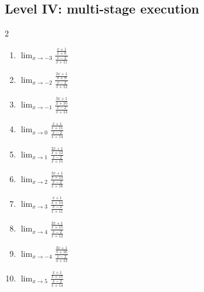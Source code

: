 \documentclass[11pt,oneside]{book}
\begin{document}
\subsection*{Level IV: multi-stage execution}
\begin{multicols}{2}
\begin{enumerate}[leftmargin=*,label=\textbf{\arabic*.},itemsep=0.65\baselineskip]
\item $\displaystyle \lim_{x \to -3} \frac{\frac{x + 1}{x + 8}}{\frac{x - 2}{x + 11}}$
\item $\displaystyle \lim_{x \to -2} \frac{\frac{2 x + 1}{x + 9}}{\frac{x - 2}{x + 12}}$
\item $\displaystyle \lim_{x \to -1} \frac{\frac{3 x + 1}{x + 10}}{\frac{x - 2}{x + 13}}$
\item $\displaystyle \lim_{x \to 0} \frac{\frac{x + 1}{x + 11}}{\frac{x - 2}{x + 14}}$
\item $\displaystyle \lim_{x \to 1} \frac{\frac{2 x + 1}{x + 12}}{\frac{x - 2}{x + 15}}$
\item $\displaystyle \lim_{x \to 2} \frac{\frac{3 x + 1}{x + 13}}{\frac{x - 2}{x + 16}}$
\item $\displaystyle \lim_{x \to 3} \frac{\frac{x + 1}{x + 14}}{\frac{x - 2}{x + 11}}$
\item $\displaystyle \lim_{x \to 4} \frac{\frac{2 x + 1}{x + 15}}{\frac{x - 2}{x + 12}}$
\item $\displaystyle \lim_{x \to -4} \frac{\frac{3 x + 1}{x + 16}}{\frac{x - 2}{x + 13}}$
\item $\displaystyle \lim_{x \to 5} \frac{\frac{x + 1}{x + 17}}{\frac{x - 2}{x + 14}}$
\end{enumerate}
\end{multicols}
\end{document}

